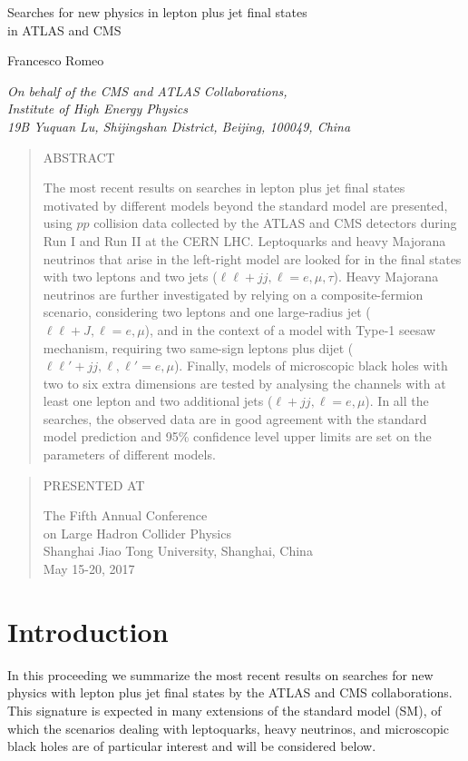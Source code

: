 \documentclass[10pt]{article}
\def\Title#1{\begin{center} {\Large #1 } \end{center}}
\def\Author#1{\begin{center}{ \sc #1} \end{center}}
\def\Address#1{\begin{center}{ \it #1} \end{center}}
\newcommand\pubblock{\rightline{\begin{tabular}{l} Proceedings of the Fifth Annual LHCP\\ \pubnumber\\
         \pubdate  \end{tabular}}}
\newenvironment{Abstract}{\begin{quotation} \begin{center} 
             \large ABSTRACT \end{center}\bigskip 
      \begin{center}\begin{large}}{\end{large}\end{center} \end{quotation}}
\newenvironment{Presented}{\begin{quotation} \begin{center} 
             PRESENTED AT\end{center}\bigskip 
      \begin{center}\begin{large}}{\end{large}\end{center} \end{quotation}}
\newcommand\pubnumber{}
\newcommand\pubdate{\today}
\def\affiliation{
On behalf of the CMS and ATLAS Collaborations, \\
Institute of High Energy Physics\\
19B Yuquan Lu, Shijingshan District, Beijing, 100049, China}
\def\support{\footnote{Work supported by  XYZ Foundation }}
\begin{document}
\large
\begin{titlepage}
\pubblock


\vfill
\Title{  Searches for new physics in lepton plus jet final states\\ in ATLAS and CMS  }
\vfill

\Author{ Francesco Romeo  }
\Address{\affiliation}
\vfill
\begin{Abstract}
The most recent results on searches in lepton plus jet final states motivated by different models beyond the standard model are presented,
using $pp$ collision data collected by the ATLAS and CMS detectors during Run I and Run II at the CERN LHC.
Leptoquarks and heavy Majorana neutrinos that arise in the left-right model
are looked for in the final states with two leptons and two jets ($\ell\ell + jj, \ell = e,\mu,\tau$).
Heavy Majorana neutrinos are further investigated by relying on a composite-fermion scenario, considering two leptons and one large-radius jet ($\ell\ell + J, \ell = e,\mu$),
and in the context of a model with Type-1 seesaw mechanism, requiring two same-sign leptons plus dijet ($\ell\ell' + jj, \ell,\ell' = e,\mu$).
Finally, models of microscopic black holes with two to six extra dimensions are tested by analysing 
the channels with at least one lepton and two additional jets ($\ell + jj, \ell = e,\mu$).
In all the searches, the observed data are in good agreement with the standard model prediction
and 95\% confidence level upper limits are set on the parameters of different models.
\end{Abstract}
\vfill

\begin{Presented}
The Fifth Annual Conference\\
 on Large Hadron Collider Physics \\
Shanghai Jiao Tong University, Shanghai, China\\ 
May 15-20, 2017
\end{Presented}
\vfill
\end{titlepage}
\def\thefootnote{\fnsymbol{footnote}}
\setcounter{footnote}{0}
%

\normalsize 

\vspace{-0.5cm}
\section{Introduction}
\vspace{-0.15cm}
In this proceeding we summarize the most recent results on searches for new physics with lepton plus jet final states by the ATLAS \cite{ATLAS} and CMS \cite{CMS} collaborations.
This signature is expected in many extensions of the standard model (SM), of which the scenarios dealing with leptoquarks, heavy neutrinos, and microscopic black holes 
are of particular interest and will be considered below.%
\end{document}
